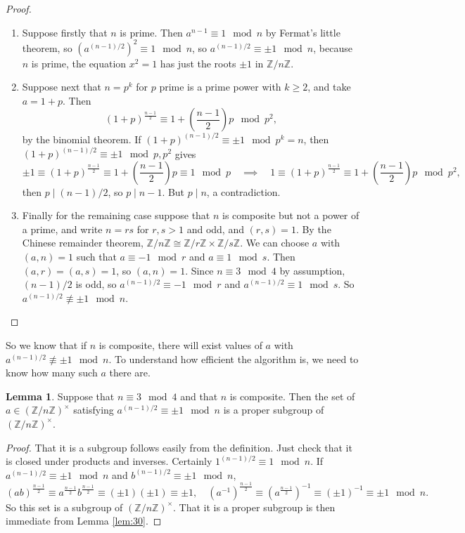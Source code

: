 \documentclass{article}
\newcommand{\Z}{\mathbb{Z}}
\newcommand{\rb}[1]{\left( #1 \right)}
\newcommand{\unit}[1]{\rb{\Z / #1\Z}^\times}
\theoremstyle{definition}\newtheorem{definition}{Definition}
\theoremstyle{definition}\newtheorem{remark}[definition]{Remark}
\theoremstyle{definition}\newtheorem*{example}{Example}
\theoremstyle{definition}\newtheorem*{note}{Note}
\newtheorem{lemma}[definition]{Lemma}
\begin{document}
\begin{proof}
\hfill
\begin{enumerate}
\item Suppose firstly that $ n $ is prime. Then $ a^{n - 1} \equiv 1 \mod n $ by Fermat's little theorem, so $ \rb{a^{\rb{n - 1} / 2}}^2 \equiv 1 \mod n $, so $ a^{\rb{n - 1} / 2} \equiv \pm 1 \mod n $, because $ n $ is prime, the equation $ x^2 = 1 $ has just the roots $ \pm 1 $ in $ \Z / n\Z $.
\item Suppose next that $ n = p^k $ for $ p $ prime is a prime power with $ k \ge 2 $, and take $ a = 1 + p $. Then
$$ \rb{1 + p}^{\tfrac{n - 1}{2}} \equiv 1 + \rb{\dfrac{n - 1}{2}}p \mod p^2, $$
by the binomial theorem. If $ \rb{1 + p}^{\rb{n - 1} / 2} \equiv \pm 1 \mod p^k = n $, then $ \rb{1 + p}^{\rb{n - 1} / 2} \equiv \pm 1 \mod p, p^2 $ gives
$$ \pm 1 \equiv \rb{1 + p}^{\tfrac{n - 1}{2}} \equiv 1 + \rb{\dfrac{n - 1}{2}}p \equiv 1 \mod p \quad \implies \quad 1 \equiv \rb{1 + p}^{\tfrac{n - 1}{2}} \equiv 1 + \rb{\dfrac{n - 1}{2}}p \mod p^2, $$
then $ p \mid \rb{n - 1} / 2 $, so $ p \mid n - 1 $. But $ p \mid n $, a contradiction.
\item Finally for the remaining case suppose that $ n $ is composite but not a power of a prime, and write $ n = rs $ for $ r, s > 1 $ and odd, and $ \rb{r, s} = 1 $. By the Chinese remainder theorem, $ \Z / n\Z \cong \Z / r\Z \times \Z / s\Z $. We can choose $ a $ with $ \rb{a, n} = 1 $ such that $ a \equiv -1 \mod r $ and $ a \equiv 1 \mod s $. Then $ \rb{a, r} = \rb{a, s} = 1 $, so $ \rb{a, n} = 1 $. Since $ n \equiv 3 \mod 4 $ by assumption, $ \rb{n - 1} / 2 $ is odd, so $ a^{\rb{n - 1} / 2} \equiv -1 \mod r $ and $ a^{\rb{n - 1} / 2} \equiv 1 \mod s $. So $ a^{\rb{n - 1} / 2} \not\equiv \pm 1 \mod n $.
\end{enumerate}
\end{proof}

So we know that if $ n $ is composite, there will exist values of $ a $ with $ a^{\rb{n - 1} / 2} \not\equiv \pm 1 \mod n $. To understand how efficient the algorithm is, we need to know how many such $ a $ there are.

\begin{lemma}
\label{lem:31}
Suppose that $ n \equiv 3 \mod 4 $ and that $ n $ is composite. Then the set of $ a \in \unit{n} $ satisfying $ a^{\rb{n - 1} / 2} \equiv \pm 1 \mod n $ is a proper subgroup of $ \unit{n} $.
\end{lemma}

\begin{proof}
That it is a subgroup follows easily from the definition. Just check that it is closed under products and inverses. Certainly $ 1^{\rb{n - 1} / 2} \equiv 1 \mod n $. If $ a^{\rb{n - 1} / 2} \equiv \pm 1 \mod n $ and $ b^{\rb{n - 1} / 2} \equiv \pm 1 \mod n $,
$$ \rb{ab}^{\tfrac{n - 1}{2}} \equiv a^{\tfrac{n - 1}{2}}b^{\tfrac{n - 1}{2}} \equiv \rb{\pm 1}\rb{\pm 1} \equiv \pm 1, \quad \rb{a^{-1}}^{\tfrac{n - 1}{2}} \equiv \rb{a^{\tfrac{n - 1}{2}}}^{-1} \equiv \rb{\pm 1}^{-1} \equiv \pm 1 \mod n. $$
So this set is a subgroup of $ \unit{n} $. That it is a proper subgroup is then immediate from Lemma \ref{lem:30}.
\end{proof}
\end{document}
